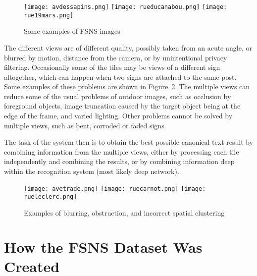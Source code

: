 \documentclass[runningheads]{llncs}
\begin{document}
\begin{figure}
\centering
\texttt{[image: avdessapins.png]}
\texttt{[image: rueducanabou.png]}
\texttt{[image: rue19mars.png]}
\caption{Some examples of FSNS images}
\label{fig:samples}
\end{figure}

The different views are of different quality, possibly taken from an acute angle, or blurred by motion,
 distance from the camera, or by unintentional privacy filtering. Occasionally some of the tiles may
 be views of a different sign altogether, which can happen when two signs are attached to the same post.
 Some examples of these problems are shown in Figure~\ref{fig:blurring}. The multiple views can reduce
 some of the usual problems of outdoor images, such as occlusion by foreground objects, image truncation
 caused by the target object being at the edge of the frame, and varied lighting. Other problems cannot
 be solved by multiple views, such as bent, corroded or faded signs.

The task of the system then is to obtain the best possible canonical text result by combining information from the multiple views, either by processing each tile independently and combining the results, or by combining information deep within the recognition system (most likely deep network).

\begin{figure}
\centering
\texttt{[image: avetrade.png]}
\texttt{[image: ruecarnot.png]}
\texttt{[image: rueleclerc.png]}
\caption{Examples of blurring, obstruction, and incorrect spatial clustering}
\label{fig:blurring}
\end{figure}

\section{How the FSNS Dataset Was Created}
\label{sec:created}
\end{document}
